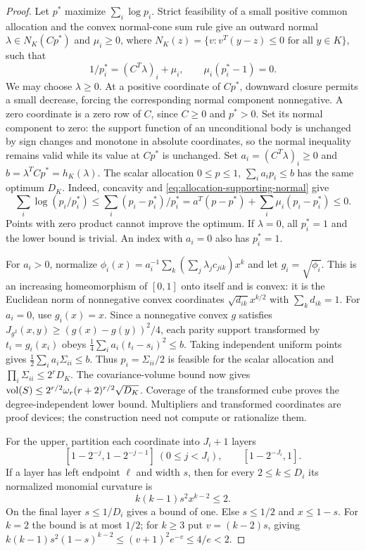 \begin{proof}
Let $p^*$ maximize $\sum_i\log p_i$. Strict feasibility of a small
positive common allocation and the convex normal-cone sum rule give
an outward normal $\lambda\in N_K(Cp^*)$ and $\mu_i\ge0$, where
$N_K(z)=\{v:v^T(y-z)\le0\text{ for all }y\in K\}$, such that
\begin{equation}\label{eq:allocation-supporting-normal}
 1/p_i^*=(C^T\lambda)_i+\mu_i,\qquad
 \mu_i(p_i^*-1)=0.
\end{equation}
We may choose $\lambda\ge0$. At a positive coordinate of $Cp^*$,
downward closure permits a small decrease, forcing the corresponding
normal component nonnegative. A zero coordinate is a zero row of $C$,
since $C\ge0$ and $p^*>0$. Set its normal component to zero: the
support function of an unconditional body is unchanged by sign changes
and monotone in absolute coordinates, so the normal inequality remains
valid while its value at $Cp^*$ is unchanged.
Set $a_i=(C^T\lambda)_i\ge0$ and
$b=\lambda^TCp^*=h_K(\lambda)$. The scalar allocation
$0\le p\le1$, $\sum_i a_ip_i\le b$ has the same optimum $D_K$.
Indeed, concavity and \eqref{eq:allocation-supporting-normal} give
\[
 \sum_i\log(p_i/p_i^*)
 \le\sum_i(p_i-p_i^*)/p_i^*
 =a^T(p-p^*)+\sum_i\mu_i(p_i-p_i^*)\le0.
\]
Points with zero product cannot improve the optimum. If $\lambda=0$,
all $p_i^*=1$ and the lower bound is trivial. An index with $a_i=0$
also has $p_i^*=1$.

For $a_i>0$, normalize
$\phi_i(x)=a_i^{-1}\sum_k(\sum_j\lambda_jc_{jik})x^k$ and let
$g_i=\sqrt{\phi_i}$. This is an increasing homeomorphism of $[0,1]$
onto itself and is convex: it is the Euclidean norm of nonnegative
convex coordinates $\sqrt{d_{ik}}x^{k/2}$ with $\sum_kd_{ik}=1$.
For $a_i=0$, use $g_i(x)=x$. Since a nonnegative convex $g$ satisfies
$J_{g^2}(x,y)\ge(g(x)-g(y))^2/4$, each parity support transformed
by $t_i=g_i(x_i)$ obeys
$\frac14\sum_i a_i(t_i-s_i)^2\le b$. Taking independent uniform
points gives $\frac12\sum_i a_i\Sigma_{ii}\le b$.
Thus $p_i=\Sigma_{ii}/2$ is feasible for the scalar allocation and
$\prod_i\Sigma_{ii}\le2^rD_K$. The covariance-volume bound now
gives $\operatorname{vol}(S)\le2^{r/2}\omega_r(r+2)^{r/2}\sqrt{D_K}$.
Coverage of the transformed cube proves the degree-independent lower
bound. Multipliers and transformed coordinates are proof devices;
the construction need not compute or rationalize them.

For the upper, partition each coordinate into $J_i+1$ layers
\begin{equation}\label{eq:dyadic-endpoint-layers}
 [1-2^{-j},1-2^{-j-1}]\ (0\le j<J_i),\qquad
 [1-2^{-J_i},1].
\end{equation}
If a layer has left endpoint $\ell$ and width $s$, then for every
$2\le k\le D_i$ its normalized monomial curvature is
\begin{equation}\label{eq:layer-curvature}
 k(k-1)s^2x^{k-2}\le2.
\end{equation}
On the final layer $s\le1/D_i$ gives a bound of one. Else $s\le1/2$
and $x\le1-s$. For $k=2$ the bound is at most $1/2$; for $k\ge3$
put $v=(k-2)s$, giving
$k(k-1)s^2(1-s)^{k-2}\le(v+1)^2e^{-v}\le4/e<2$.


\end{proof}
